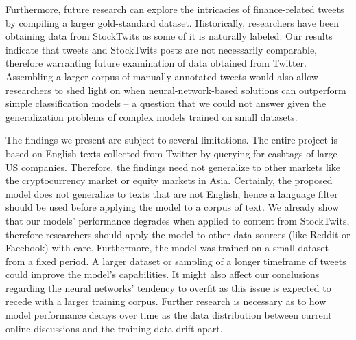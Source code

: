 Furthermore, future research can explore the intricacies of finance-related tweets by compiling a larger gold-standard dataset. Historically, researchers have been obtaining data from StockTwits as some of it is naturally labeled. Our results indicate that tweets and StockTwits posts are not necessarily comparable, therefore warranting future examination of data obtained from Twitter. Assembling a larger corpus of manually annotated tweets would also allow researchers to shed light on when neural-network-based solutions can outperform simple classification models -- a question that we could not answer given the generalization problems of complex models trained on small datasets.

The findings we present are subject to several limitations. The entire project is based on English texts collected from Twitter by querying for cashtags of large US companies. Therefore, the findings need not generalize to other markets like the cryptocurrency market or equity markets in Asia. Certainly, the proposed model does not generalize to texts that are not English, hence a language filter should be used before applying the model to a corpus of text. We already show that our models' performance degrades when applied to content from StockTwits, therefore researchers should apply the model to other data sources (like Reddit or Facebook) with care. Furthermore, the model was trained on a small dataset from a fixed period. A larger dataset or sampling of a longer timeframe of tweets could improve the model's capabilities. It might also affect our conclusions regarding the neural networks' tendency to overfit as this issue is expected to recede with a larger training corpus. Further research is necessary as to how model performance decays over time as the data distribution between current online discussions and the training data drift apart.

